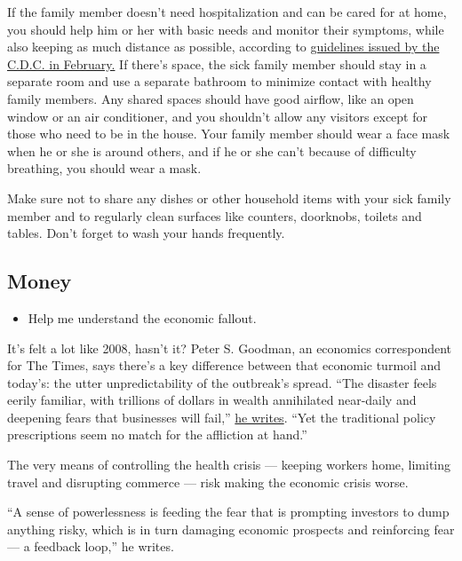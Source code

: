 If the family member doesn't need hospitalization and can be cared for
at home, you should help him or her with basic needs and monitor their
symptoms, while also keeping as much distance as possible, according to
\href{https://www.cdc.gov/coronavirus/2019-ncov/hcp/guidance-prevent-spread.html}{guidelines
issued by the C.D.C. in February.} If there's space, the sick family
member should stay in a separate room and use a separate bathroom to
minimize contact with healthy family members. Any shared spaces should
have good airflow, like an open window or an air conditioner, and you
shouldn't allow any visitors except for those who need to be in the
house. Your family member should wear a face mask when he or she is
around others, and if he or she can't because of difficulty breathing,
you should wear a mask.

Make sure not to share any dishes or other household items with your
sick family member and to regularly clean surfaces like counters,
doorknobs, toilets and tables. Don't forget to wash your hands
frequently.

\hypertarget{money}{%
\subsection{Money}\label{money}}

\begin{itemize}
\tightlist
\item
  Help me understand the economic fallout.
\end{itemize}

It's felt a lot like 2008, hasn't it? Peter S. Goodman, an economics
correspondent for The Times, says there's a key difference between that
economic turmoil and today's: the utter unpredictability of the
outbreak's spread. ``The disaster feels eerily familiar, with trillions
of dollars in wealth annihilated near-daily and deepening fears that
businesses will fail,''
\href{https://www.nytimes3xbfgragh.onion/2020/03/13/business/coronavirus-global-economy.html}{he
writes}. ``Yet the traditional policy prescriptions seem no match for
the affliction at hand.''

The very means of controlling the health crisis --- keeping workers
home, limiting travel and disrupting commerce --- risk making the
economic crisis worse.

``A sense of powerlessness is feeding the fear that is prompting
investors to dump anything risky, which is in turn damaging economic
prospects and reinforcing fear --- a feedback loop,'' he writes.

